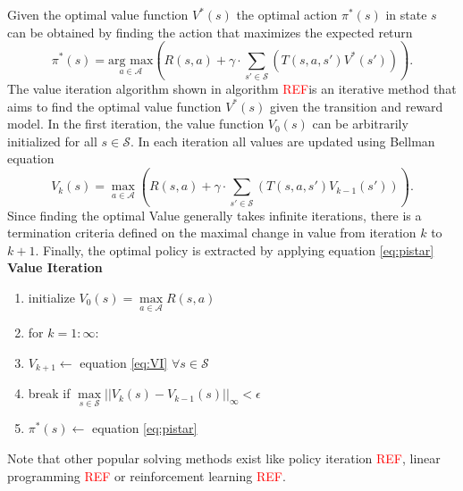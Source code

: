 Given the optimal value function $V^*(s)$ the optimal action $\pi^*(s)$ in state $s$ can be obtained by finding the action that maximizes the expected return
\begin{equation}\label{eq:pistar}
    \pi^*(s) = \underset{a\in\mathcal{A}}{\text{arg max}}\left(R(s,a) + \gamma\cdot \sum_{s'\in\mathcal{S}}\left(T(s,a,s')V^*(s')\right)\right).
\end{equation}
The value iteration algorithm shown in algorithm \textcolor{red}{REF}is an iterative method that aims to find the optimal value function $V^*(s)$ given the transition and reward model. In the first iteration, the value function $V_0(s)$ can be arbitrarily initialized for all $s\in\mathcal{S}$. In each iteration all values are updated using Bellman equation
\begin{equation}\label{eq:VI}
    V_{k}(s) = \underset{a\in\mathcal{A}}{\max}  \left(R(s,a) + \gamma\cdot \sum_{s'\in\mathcal{S}}\left(T(s,a,s')V_{k-1}(s')\right)\right).
\end{equation}
Since finding the optimal Value generally takes infinite iterations, there is a termination criteria defined on the maximal change in value from iteration $k$ to $k+1$. Finally, the optimal policy is extracted by applying equation \ref{eq:pistar}\\
\textbf{Value Iteration}
\begin{enumerate}
    \item initialize $V_0(s) = \underset{a\in\mathcal{A}}{\max}R(s,a)$
    \item for $k=1:\infty$:
    \item $V_{k+1} \leftarrow$ equation \ref{eq:VI} $\forall s\in\mathcal{S}$
    \item break if $\underset{s\in\mathcal{S}}{\max }||V_k(s)-V_{k-1}(s)||_\infty < \epsilon$
    \item $\pi^*(s) \leftarrow$ equation \ref{eq:pistar}
\end{enumerate}
Note that other popular solving methods exist like policy iteration \textcolor{red}{REF}, linear programming \textcolor{red}{REF} or reinforcement learning \textcolor{red}{REF}.

